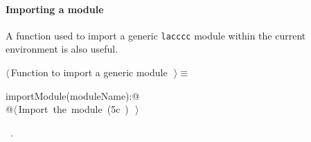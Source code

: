 \documentclass[11pt,oneside]{article}	%
\begin{document}
\paragraph{Importing a module} A function used to import a generic \texttt{lacccc} module within the current environment is also useful.
\begin{flushleft} \small
\begin{minipage}{\linewidth} \label{scrap13}
$\langle\,$Function to import a generic module\nobreak\ {\footnotesize {}}$\,\rangle\equiv$
\vspace{-1ex}
\begin{list}{}{} \item
\mbox{}\verb@def importModule(moduleName):@\\
\mbox{}\verb@   @\hbox{$\langle\,$Import the module\nobreak\ ({\footnotesize 5c\label{scrap14}
 }\mbox{}\verb@moduleName@ ) {\footnotesize {}}$\,\rangle$}\verb@@\\
\mbox{}\verb@@{\NWsep}
\end{list}
\vspace{-1ex}
\footnotesize\addtolength{\baselineskip}{-1ex}
\begin{list}{}{\setlength{\itemsep}{-\parsep}\setlength{\itemindent}{-\leftmargin}}
\item \NWtxtMacroRefIn\ .
\end{list}
\end{minipage}\\[4ex]
\end{flushleft}
\end{document}

